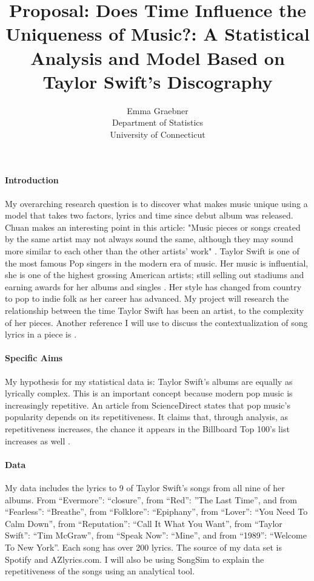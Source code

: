 \documentclass[12pt]{article}
\title{Proposal: Does Time Influence the Uniqueness of Music?: A Statistical Analysis and Model Based on Taylor Swift's Discography}
\author{Emma Graebner\\
  Department of Statistics\\
  University of Connecticut
}
\begin{document}
\maketitle


\paragraph{Introduction}
My overarching research question is to discover what makes music unique using a model that takes two factors, lyrics and time since debut album was released. Chuan makes an interesting point in this article: "Music pieces or songs created by the same artist may not always sound the same, although they may sound more similar to each other than the other artists' work" \cite{chuan2013multimodal}. Taylor Swift is one of the most famous Pop singers in the modern era of music. Her music is influential, she is one of the highest grossing American artists; still selling out stadiums and earning awards for her albums and singles \citep{fogarty2021you} . Her style has changed from country to pop to indie folk as her career has advanced. My project will research the relationship between the time Taylor Swift has been an artist, to the complexity of her pieces. \citep{sloan2021taylor} 
Another reference I will use to discuss the contextualization of song lyrics in a piece is \citep{mayer2008rhyme}. 


\citep{perone2017words}

\paragraph{Specific Aims}
My hypothesis for my statistical data is: Taylor Swift’s albums are equally as lyrically complex. This is an important concept because modern pop music is increasingly repetitive. An article from ScienceDirect states that pop music's popularity depends on its repetitiveness. It claims that, through analysis, as repetitiveness increases, the chance it appears in the Billboard Top 100's list increases as well \citep{nunes2015power}. 



\paragraph{Data}
My data includes the lyrics to 9 of Taylor Swift’s songs from all nine of her albums. From “Evermore”: “closure”, from “Red”: ”The Last Time”, and from “Fearless”: “Breathe”, from “Folklore”: “Epiphany”, from “Lover”: “You Need To Calm Down”, from “Reputation”: “Call It What You Want”, from “Taylor Swift”: “Tim McGraw”, from “Speak Now”: “Mine”, and from “1989”: “Welcome To New York”. Each song has over 200 lyrics. The source of my data set is Spotify and AZlyrics.com. I will also be using SongSim to explain the repetitiveness of the songs using an analytical tool.
\end{document}
